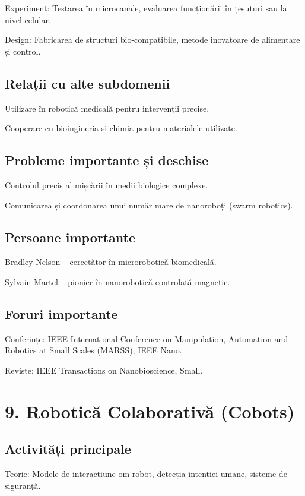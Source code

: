 \documentclass[12pt]{article}
\begin{document}
Experiment:
Testarea în microcanale, evaluarea funcționării în țesuturi sau la nivel celular.

Design:
Fabricarea de structuri bio-compatibile, metode inovatoare de alimentare și control.

\subsection*{Relații cu alte subdomenii}

Utilizare în robotică medicală pentru intervenții precise.

Cooperare cu bioingineria și chimia pentru materialele utilizate.

\subsection*{Probleme importante și deschise}

Controlul precis al mișcării în medii biologice complexe.

Comunicarea și coordonarea unui număr mare de nanoroboți (swarm robotics).

\subsection*{Persoane importante}

Bradley Nelson – cercetător în microrobotică biomedicală.

Sylvain Martel – pionier în nanorobotică controlată magnetic.

\subsection*{Foruri importante}

Conferințe: IEEE International Conference on Manipulation, Automation and Robotics at Small Scales (MARSS), IEEE Nano.

Reviste: IEEE Transactions on Nanobioscience, Small.

\section{9. Robotică Colaborativă (Cobots)}

\subsection*{Activități principale}

Teorie:
Modele de interacțiune om-robot, detecția intenției umane, sisteme de siguranță.
\end{document}

